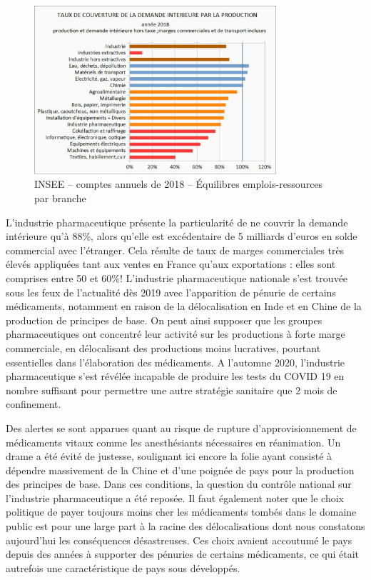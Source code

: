 \documentclass[a4paper]{article}
\begin{document}
\begin{figure}[H]
    \centering
    \includegraphics*[width=0.8\textwidth]{images/couverture}
    \caption{INSEE – comptes annuels de 2018 – Équilibres emplois-ressources par branche}
    \label{fig:couverture}
\end{figure}

L’industrie pharmaceutique présente la particularité de ne couvrir la demande intérieure qu’à 88\%, alors qu’elle est excédentaire de 5 milliards d'euros en solde commercial avec l’étranger.  Cela résulte de taux de marges commerciales très élevés appliquées tant aux ventes en France qu’aux exportations : elles sont comprises entre 50 et 60\%! L’industrie pharmaceutique nationale s’est trouvée sous les feux de l’actualité dès 2019 avec l’apparition de pénurie de certains médicaments, notamment en raison de la délocalisation en Inde et en Chine de la production de principes de base. On peut ainsi supposer que les groupes pharmaceutiques ont concentré leur activité sur les productions à forte marge commerciale, en délocalisant des productions moins lucratives, pourtant essentielles dans l’élaboration des médicaments. A l’automne 2020, l’industrie pharmaceutique s’est révélée incapable de produire les tests du COVID 19 en nombre suffisant pour permettre une autre stratégie sanitaire que 2 mois de confinement. 

Des alertes se sont apparues quant au risque de rupture d’approvisionnement de médicaments vitaux comme les anesthésiants nécessaires en réanimation. Un drame a été évité de justesse, soulignant ici encore la folie ayant consisté à dépendre massivement de la Chine et d’une poignée de pays pour la production des principes de base. Dans ces conditions, la question du contrôle national sur l’industrie pharmaceutique a été reposée.
Il faut également noter que le choix politique de payer toujours moins cher les médicaments tombés dans le domaine public est pour une large part à la racine des délocalisations dont nous constatons aujourd’hui les conséquences désastreuses. Ces choix avaient accoutumé le pays depuis des années à supporter des pénuries de certains médicaments, ce qui était autrefois une caractéristique de pays sous développés. 
\end{document}
